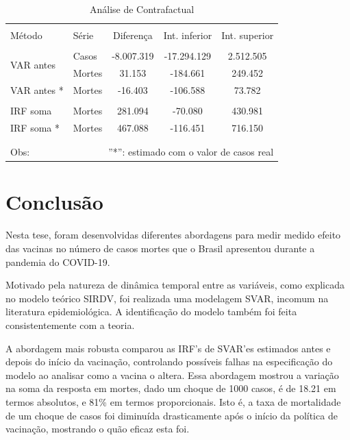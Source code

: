 \documentclass[
	12pt,				%
	oneside,			%
	a4paper,			%
	english,			%
	brazil				%
	hyperref = {colorlinks, citecolor=c1d, linkcolor=c2d, urlcolor=c3d, colorlinks}
	]{abntex2}
\begin{document}
\begin{table}[H] \centering 
\renewcommand{\arraystretch}{1.2}
  \caption{Análise de Contrafactual}\label{tb:counter2}
\begin{tabular}{@{\extracolsep{5pt}} llccc} 
\\[-1.8ex]\hline 
\hline \\[-1.8ex] 
Método & Série & Diferença & Int. inferior & Int. superior \\ 
\hline \\[-1.8ex] 
\multirow{2}{*}{VAR antes}  & Casos     & -8.007.319    & -17.294.129   & 2.512.505 \\ 
                            & Mortes    & 31.153        & -184.661      & 249.452 \\ 
VAR antes *                 & Mortes    & -16.403       & -106.588      & 73.782  \\ 
\\[-1.8ex] 
IRF soma                   & Mortes    & 281.094    & -70.080       & 430.981 \\
IRF soma *                  & Mortes    & 467.088       & -116.451        & 716.150 \\
\\[-1.8ex]\hline 
\hline \\[-1.8ex] 
Obs: & \multicolumn{4}{r}{''*'': estimado com o valor de casos real}
\end{tabular} 
\end{table} 


\let\clearpage\relax
\chapter{Conclusão}
Nesta tese, foram desenvolvidas diferentes abordagens para medir medido efeito das vacinas no número de casos mortes que o Brasil apresentou durante a pandemia do COVID-19.

Motivado pela natureza de dinâmica temporal entre as variáveis, como explicada no modelo teórico SIRDV, foi realizada uma modelagem SVAR, incomum na literatura epidemiológica. A identificação do modelo também foi feita consistentemente com a teoria.

A abordagem mais robusta comparou as IRF's de SVAR'es estimados antes e depois do início da vacinação, controlando possíveis falhas na especificação do modelo ao analisar como a vacina o altera. Essa abordagem mostrou a variação na soma da resposta em mortes, dado um choque de 1000 casos, é de 18.21 em termos absolutos, e 81\% em termos proporcionais. Isto é, a taxa de mortalidade de um choque de casos foi diminuída drasticamente após o início da política de vacinação, mostrando o quão eficaz esta foi.
\end{document}
